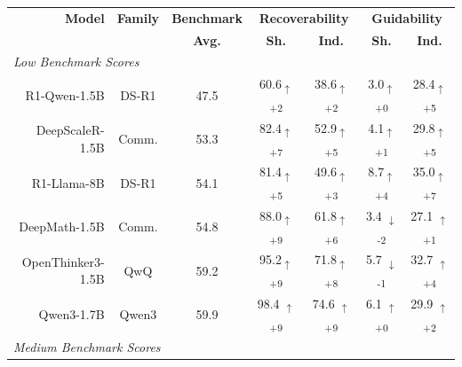 \documentclass{article} %
\begin{document}
\begin{table}[t]
  \centering
  \small
    \begin{tabular}{r|c|c|cc|cc}
    \toprule
    \textbf{Model} &
    \textbf{Family} &
    \multicolumn{1}{c|}{\textbf{Benchmark}} & 
    \multicolumn{2}{c|}{\textbf{Recoverability}} &
    \multicolumn{2}{c}{\textbf{Guidability}} \\
    &  & \multicolumn{1}{c|}{\textbf{Avg.}} &
    \textbf{Sh.} & \textbf{Ind.} & \textbf{Sh.} & \textbf{Ind.} \\
    \midrule
    \multicolumn{7}{l}{\textit{Low Benchmark Scores}} \\
    \midrule

    R1-Qwen-1.5B    & DS-R1 &  47.5 & \cellcolor{green!12}60.6\textsubscript{$\uparrow$+2} & \cellcolor{green!12}38.6\textsubscript{$\uparrow$+2} & 
    \cellcolor{green!0}3.0\textsubscript{$\uparrow$+0} & 
    \cellcolor{green!15}28.4\textsubscript{$\uparrow$+5} \\

    DeepScaleR-1.5B         & Comm. & 53.3 & \cellcolor{green!27}82.4\textsubscript{$\uparrow$+7} & \cellcolor{green!15}52.9\textsubscript{$\uparrow$+5} & 
    \cellcolor{green!11}4.1\textsubscript{$\uparrow$+1} & 
    \cellcolor{green!15}29.8\textsubscript{$\uparrow$+5} \\

    R1-Llama-8B     & DS-R1 & 54.1 & 
    \cellcolor{green!15}81.4\textsubscript{$\uparrow$+5} & \cellcolor{green!13}49.6\textsubscript{$\uparrow$+3} & 
    \cellcolor{green!14}8.7\textsubscript{$\uparrow$+4} &
    \cellcolor{green!27}35.0\textsubscript{$\uparrow$+7} \\

    DeepMath-1.5B           & Comm. & 54.8 & \cellcolor{green!29}88.0\textsubscript{$\uparrow$+9} & \cellcolor{green!16}61.8\textsubscript{$\uparrow$+6} & 
    \cellcolor{red!12} 3.4 \textsubscript{$\downarrow$-2} & 
    \cellcolor{green!11} 27.1 \textsubscript{$\uparrow$+1} \\

    OpenThinker3-1.5B       & QwQ & 59.2 & \cellcolor{green!29}95.2\textsubscript{$\uparrow$+9} & \cellcolor{green!28}71.8\textsubscript{$\uparrow$+8} & 
    \cellcolor{red!11} 5.7 \textsubscript{$\downarrow$-1}& 
    \cellcolor{green!14} 32.7 \textsubscript{$\uparrow$+4} \\

    Qwen3-1.7B              & Qwen3 & 59.9 &
    \cellcolor{green!29}98.4 \textsubscript{$\uparrow$+9} & 
    \cellcolor{green!29}74.6 \textsubscript{$\uparrow$+9} & 
    \cellcolor{green!0} 6.1  \textsubscript{$\uparrow$+0}& 
    \cellcolor{green!12} 29.9 \textsubscript{$\uparrow$+2}\\
    \midrule
    \multicolumn{7}{l}{\textit{Medium Benchmark Scores}} \\
    \midrule


\end{tabular}
\end{table}
\end{document}
